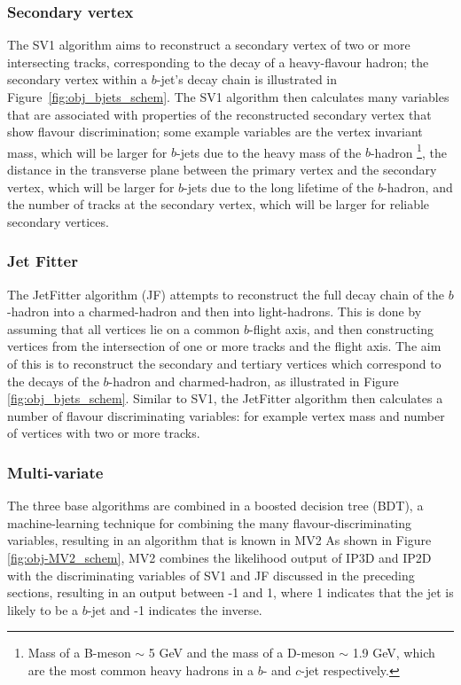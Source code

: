 \subsubsection{Secondary vertex}
\label{sec:obj-bjets_SV}


The SV1 algorithm aims to reconstruct a secondary vertex of two or more intersecting tracks, corresponding to the decay of a heavy-flavour hadron;
the secondary vertex within a $b$-jet's decay chain is illustrated in Figure~\ref{fig:obj_bjets_schem}.
The SV1 algorithm then calculates many variables that are associated with properties of the reconstructed secondary vertex that show flavour discrimination;
some example variables are the vertex invariant mass,
which will be larger for $b$-jets due to the heavy mass of the $b$-hadron
\footnote{Mass of a B-meson $\sim$ 5 GeV and the mass of a D-meson $\sim$ 1.9 GeV, which are the most common heavy hadrons in a $b$- and $c$-jet respectively.}, 
the distance in the transverse plane between the primary vertex and the secondary vertex, %
which will be larger for $b$-jets due to the long lifetime of the $b$-hadron,
and the number of tracks at the secondary vertex, which will be larger for reliable secondary vertices.

\subsubsection{Jet Fitter}
\label{sec:obj-bjets_JF}

The JetFitter algorithm (JF) attempts to reconstruct the full decay chain of the $b$-hadron into a charmed-hadron and then into light-hadrons. 
This is done by assuming that all vertices lie on a common $b$-flight axis, and then constructing vertices from the intersection of
one or more tracks and the flight axis.
The aim of this is to reconstruct the secondary and tertiary vertices which correspond to the decays of the $b$-hadron and charmed-hadron,
as illustrated in Figure \ref{fig:obj_bjets_schem}.
Similar to SV1, the JetFitter algorithm then calculates a number of flavour discriminating variables:
for example vertex mass and number of vertices with two or more tracks.

\subsubsection{Multi-variate}
\label{sec:obj-bjets_MV2}

The three base algorithms are combined in a boosted decision tree (BDT), a machine-learning technique for combining the many flavour-discriminating variables,
resulting in an algorithm that is known in MV2
As shown in Figure \ref{fig:obj-MV2_schem}, MV2 combines the likelihood output of IP3D and IP2D
with the discriminating variables of SV1 and JF discussed in the preceding sections,
resulting in an output between -1 and 1, where 1 indicates that the jet is likely to be a $b$-jet and -1 indicates the inverse.

